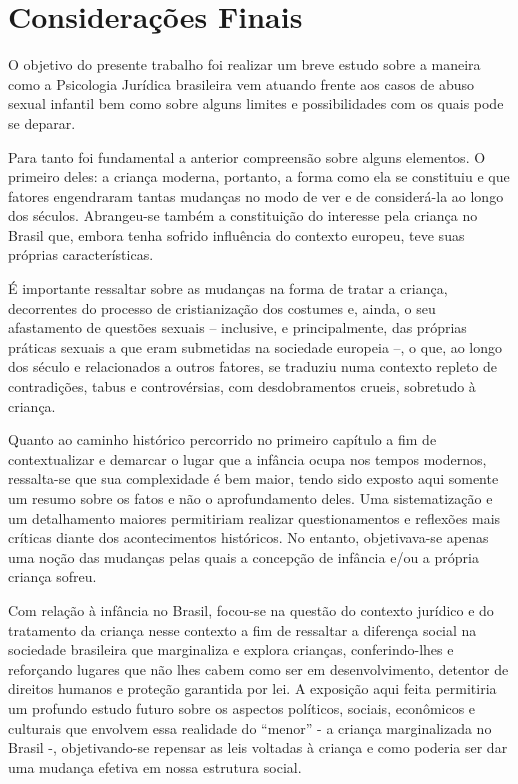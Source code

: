 
\chapter*[Considerações Finais]{Considerações Finais}

O objetivo do presente trabalho foi realizar um breve estudo sobre a maneira como a Psicologia Jurídica brasileira vem atuando frente aos casos de abuso sexual infantil bem como sobre alguns limites e possibilidades com os quais pode se deparar. 

Para tanto foi fundamental a anterior compreensão sobre alguns elementos. O primeiro deles: a criança moderna, portanto, a forma como ela se constituiu e que fatores engendraram tantas mudanças no modo de ver e de considerá-la ao longo dos séculos. Abrangeu-se também a constituição do interesse pela criança no Brasil que, embora tenha sofrido influência do contexto europeu, teve suas próprias características. 

É importante ressaltar sobre as mudanças na forma de tratar a criança, decorrentes do processo de cristianização dos costumes e, ainda, o seu afastamento de questões sexuais -- inclusive, e principalmente, das próprias práticas sexuais a que eram submetidas na sociedade europeia --, o que, ao longo dos século e relacionados a outros fatores, se traduziu numa contexto repleto de contradições, tabus e controvérsias, com desdobramentos crueis, sobretudo à criança.

Quanto ao caminho histórico percorrido no primeiro capítulo a fim de contextualizar e demarcar o lugar que a infância ocupa nos tempos modernos, ressalta-se que sua complexidade é bem maior, tendo sido exposto aqui somente um resumo sobre os fatos e não o aprofundamento deles. Uma sistematização e um detalhamento maiores permitiriam realizar questionamentos e reflexões mais críticas diante dos acontecimentos históricos. No entanto, objetivava-se apenas uma noção das mudanças pelas quais a concepção de infância e/ou a própria criança sofreu.

Com relação à infância no Brasil, focou-se na questão do contexto jurídico e do tratamento da criança nesse contexto a fim de ressaltar a diferença social  na sociedade brasileira que marginaliza e explora crianças, conferindo-lhes e reforçando lugares que não lhes cabem como ser em desenvolvimento, detentor de direitos humanos e proteção garantida por lei. A exposição aqui feita permitiria um profundo estudo futuro sobre os aspectos políticos, sociais, econômicos e culturais que envolvem essa realidade do “menor” - a criança marginalizada no Brasil -, objetivando-se repensar as leis voltadas à criança e como poderia ser dar uma mudança efetiva em nossa estrutura social. 


